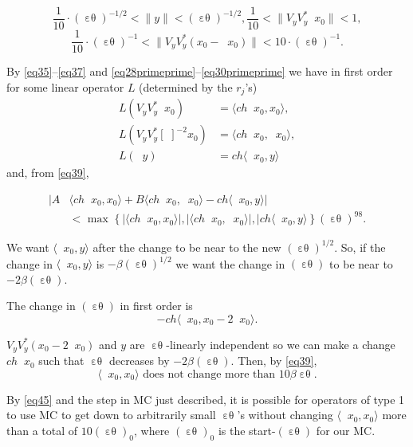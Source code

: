 \documentclass[12pt,oneside,reqno]{amsart}
\theoremstyle{definition}
\DeclareMathOperator*{\VV}{[\,\, ]^{-1}}
\DeclareMathOperator*{\VE}{\varepsilon\theta}
\begin{document}
$$\frac{1}{10} \cdot (\VE)^{-1/2} < \|y\| < (\VE)^{-1/2} , \frac{1}{10} < \|V_y V_y^* \VV x_0\|< 1 , $$ 
$$\frac{1}{10} \cdot (\VE)^{-1} < \|V_y V_y^* (x_0 - \VV x_0) \|< 10 \cdot (\VE)^{-1} .$$
 
 By \eqref{eq35}--\eqref{eq37} and \eqref{eq28primeprime}--\eqref{eq30primeprime} we have in first order for some linear operator $L$ (determined by the $r_j$'s)
 \begin{equation*}
 \begin{aligned}
 	L(V_y V_y^* \VV x_0) & = \langle ch\VV x_0, x_0 \rangle,\\
 	L(V_y V_y^* [\, \,]^{-2} x_0) & = \langle ch\VV x_0, \VV x_0 \rangle,\\
 	L(\VV y) & = ch \langle \VV x_0, y\rangle
 \end{aligned}
  \end{equation*}
 and, from \eqref{eq39}, 
 
  \begin{equation}\label{eq44}
 	\begin{aligned}
 		| A & \langle ch \VV x_0, x_0 \rangle + B \langle ch \VV x_0, \VV x_0 \rangle - ch \langle \VV x_0, y \rangle | \\
 		& <  \text{ max } \left\{ |\langle ch \VV x_0, x_0\rangle|, |\langle ch \VV x_0, \VV x_0\rangle|, |ch \langle \VV x_0, y\rangle\right\} (\VE)^{98}.
 	\end{aligned}
 \end{equation}

We want $\langle \VV x_0, y \rangle$ after the change to be near to the new $(\VE)^{1/2}$. So, if the change in 
$\langle \VV x_0, y\rangle$ is $-\beta (\VE)^{1/2}$ we want the change in $(\VE)$ to be near to $-2 \beta (\VE)$.

The change in $(\VE)$ in first order is 
$$- ch \langle \VV x_0, x_0 - 2 \VV x_0\rangle .$$

$V_y V_y^* (x_0 - 2 \VV x_0)$ and $y$ are $\VE$-linearly independent so we can make a change $ch \VV x_0$ such that $\VE$ decreases by $-2 \beta(\VE)$. Then, by \eqref{eq39}, 
\begin{equation}\label{eq45}
\langle \VV x_0, x_0\rangle \text{ does not change more than } 10 \beta \VE.
\end{equation}

By \eqref{eq45} and the step in MC just described, it is possible for operators of type 1 to use MC to get down to arbitrarily small $\VE$'s without changing $\langle \VV x_0, x_0\rangle$ more than a total of $10 (\VE)_0$, where $(\VE)_0$ is the start-$(\VE)$ for our MC.
\end{document}
